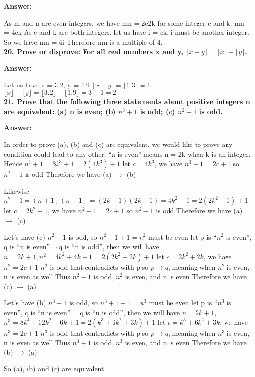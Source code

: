 \documentclass{article}
\begin{document}
\begin{large}
\textbf{Answer:}

As m and n are even integers, we have mn = 2c2k for some integer c and k.
mn = 4ck
As c and k are both integers, let us have i = ck. i must be another integer.
So we have mn = 4i
Therefore mn is a multiple of 4.\\

\textbf{20. Prove or disprove: For all real numbers x and y, $\lfloor x-y\rfloor =\lfloor x \rfloor -\lfloor y \rfloor$.}

\textbf{Answer:}

Let us have x = 3.2, y = 1.9
$\lfloor x-y\rfloor = \lfloor 1.3 \rfloor = 1$
$\lfloor x \rfloor - \lfloor y \rfloor = \lfloor 3.2 \rfloor - \lfloor 1.9 \rfloor = 3 - 1 = 2$\\

\textbf{21. Prove that the following three statements about positive integers n are equivalent: (a) n is even; (b) $n^3+1$ is odd; (c) $n^2-1$ is odd.}

\textbf{Answer:}


In order to prove (a), (b) and (c) are equivalent, we would like to prove any condition could lead to any other.
``n is even'' means n = 2k when k is an integer.
Hence $n^3 + 1 = 8k^3 + 1 = 2(4k^3) + 1$
let $c = 4k^3$, we have $n^3 + 1 = 2c + 1$
so $n^3 + 1$ is odd
Therefore we have (a) $\to$ (b)

Likewise $n^2-1 = (n+1)(n-1) = (2k+1)(2k-1) = 4k^2 - 1 = 2(2k^2-1) + 1$
let $c = 2k^2-1$, we have $n^2-1 = 2c + 1$
so $n^2-1$ is odd
Therefore we have (a) $\to$ (c)

Let's have (c) $n^2-1$ is odd, so $n^2 - 1 + 1 = n^2$ must be even
let p is ``$n^2$ is even'', q is ``n is even''
$\lnot$ q is ``n is odd'', then we will have $n = 2k+1, n^2 = 4k^2 + 4k + 1 = 2(2k^2 + 2k) + 1$
let $c = 2k^2 + 2k$, we have $n^2 = 2c + 1$
$n^2$ is odd that contradicts with p
so $p\to q$, meaning when $n^2$ is even, n is even as well
Thus $n^2-1$ is odd, $n^2$ is even, and n is even
Therefore we have (c) $\to$ (a)

Let's have (b) $n^3+1$ is odd, so $n^3 + 1 - 1 = n^3$ must be even
let p is ``$n^3$ is even'', q is ``n is even''
$\lnot$ q is ``n is odd'', then we will have $n = 2k+1$, $n^3 = 8k^3 + 12k^2 + 6k + 1 = 2(k^3 + 6k^2 + 3k) + 1$
let $c = k^3 + 6k^2 + 3k$, we have $n^3 = 2c + 1$
$n^3$ is odd that contradicts with p
so $p\to q$, meaning when $n^3$ is even, n is even as well
Thus $n^3+1$ is odd, $n^3$ is even, and n is even
Therefore we have (b) $\to$ (a)

So (a), (b) and (c) are equivalent\\


\end{large}
\end{document}
